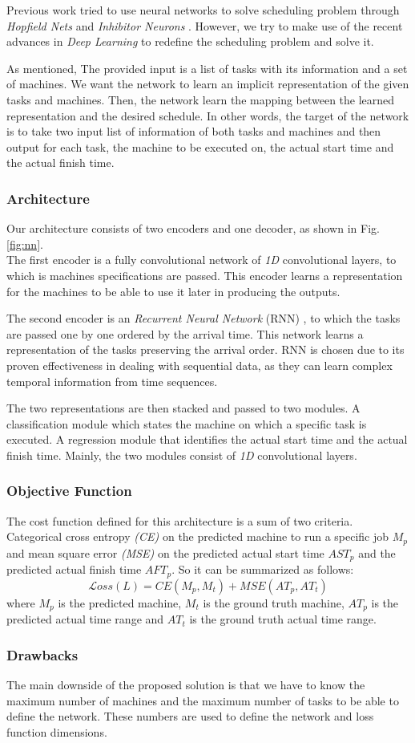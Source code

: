 Previous work tried to use neural networks to solve scheduling problem through \emph{Hopfield Nets} \cite{sathasivam2008logic} and \emph{Inhibitor Neurons} \cite{article3}. However, we try to make use of the recent advances in \emph{Deep Learning} to redefine the scheduling problem and solve it. 

As mentioned, The provided input is a list of tasks with its information and a set of machines. We want the network to learn an implicit representation of the given tasks and machines. Then, the network learn the mapping between the learned representation and the desired schedule. In other words, the target of the network is to take two input list of information of both tasks and machines and then output for each task, the machine to be executed on, the actual start time and the actual finish time. \\
    
\subsubsection{Architecture}
Our architecture consists of two encoders and one decoder, as shown in Fig.\ref{fig:nn}. \\
The first encoder is a fully convolutional network of \emph{1D} convolutional layers, to which is machines specifications are passed. This encoder learns a representation for the machines to be able to use it later in producing the outputs.

The second encoder is an \emph{Recurrent Neural Network} (RNN) \cite{chung2014empirical}, to which the tasks are passed one by one ordered by the arrival time. This network learns a representation of the tasks preserving the arrival order. RNN is chosen due to its proven effectiveness in dealing with sequential data, as they can learn complex temporal information from time sequences.

The two representations are then stacked and passed to two modules. A classification module which states the machine on which a specific task is executed. A regression module that identifies the actual start time and the actual finish time. Mainly, the two modules consist of \emph{1D} convolutional layers.
    
\subsubsection{Objective Function}
The cost function defined for this architecture is a sum of two criteria. Categorical cross entropy \emph{(CE)} on the predicted machine to run a specific job $M_p$ and mean square error \emph{(MSE)} on the predicted actual start time $AST_p$ and the predicted actual finish time $AFT_p$. So it can be summarized as follows:
\begin{equation}
\mathcal Loss(L) = CE(M_p, M_t) + MSE(AT_p, AT_t) \label{eq:l}
\end{equation}
where $M_p$ is the predicted machine, $M_t$ is the ground truth machine, $AT_p$ is the predicted actual time range and $AT_t$ is the ground truth actual time range. \\

\subsubsection{Drawbacks}
The main downside of the proposed solution is that we have to know the maximum number of machines and the maximum number of tasks to be able to define the network. These numbers are used to define the network and loss function dimensions. 